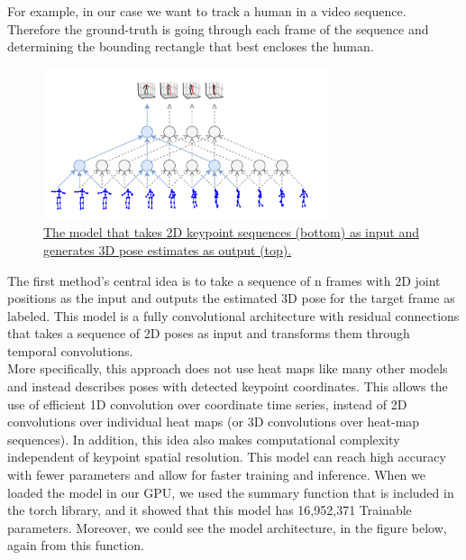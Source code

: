 For example, in our case we want to track a human in a video sequence. Therefore the ground-truth is going through each frame of the sequence and determining the bounding rectangle that best encloses the human.\\


\begin{figure}[h]
	\centering
	\includegraphics[width=0.75\textwidth]{figures/Implementation/3DModel.png}
	\captionsetup{labelformat=empty}
	\caption{\href{https://arxiv.org/pdf/1811.11742.pdf}
	{The model that takes 2D keypoint sequences (bottom) as input and generates 3D pose
estimates as output (top).}}
\end{figure}


The first method's central idea  \cite{Attention Mechanism Exploits Temporal Contexts: Real-time 3D Human Pose Reconstruction} is to take a sequence of n frames with 2D joint positions as the input and outputs the estimated 3D pose for the target frame as labeled. This model is a fully convolutional architecture with residual connections that takes a sequence of 2D poses as input and transforms them through temporal convolutions.\\

More specifically, this approach does not use heat maps like many other models and instead describes poses with detected keypoint coordinates. This allows the use of efficient 1D convolution over coordinate time series, instead of 2D convolutions over individual heat maps (or 3D convolutions over heat-map sequences). In addition, this idea also makes computational complexity independent of keypoint spatial resolution. This model can reach high accuracy with fewer parameters and allow for faster training and inference. When we loaded the model in our GPU, we used the summary function that is included in the torch library, and it showed that this model has 16,952,371 Trainable parameters. Moreover, we could see the model architecture, in the figure below, again from this function. 



